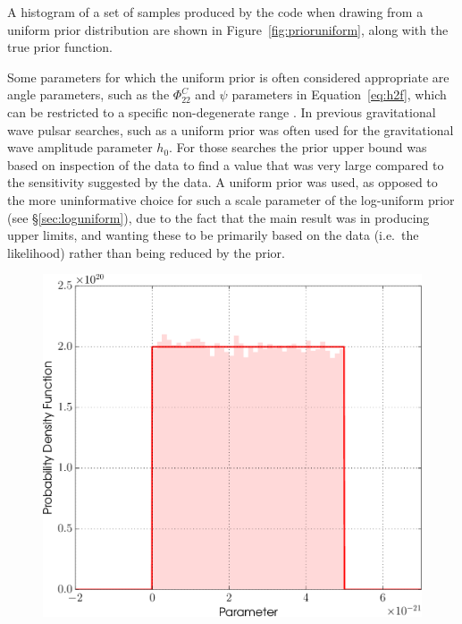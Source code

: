 A histogram of a set of samples produced by the code when drawing from a uniform prior distribution are shown in Figure~\ref{fig:prioruniform},
along with the true prior function.

Some parameters for which the uniform prior is often considered appropriate are angle parameters, such as the $\Phi_{22}^C$ and $\psi$
parameters in Equation~\ref{eq:h2f}, which can be restricted to a specific non-degenerate range \citep[see, e.g., Table~1 in][]{2015MNRAS.453.4399P}. 
In previous gravitational wave pulsar searches, such as \citet{2010ApJ...713..671A,2014ApJ...785..119A} a uniform prior was often used for
the gravitational wave amplitude parameter $h_0$. For those searches the prior upper bound was based on inspection of the data to find a
value that was very large compared to the sensitivity suggested by the data. A uniform prior was used, as opposed to the more
uninformative choice for such a scale parameter of the log-uniform prior (see \S\ref{sec:loguniform}), due to the fact that the main
result was in producing upper limits, and wanting these to be primarily based on the data (i.e.\ the likelihood) rather than being reduced
by the prior.

\begin{figure}[!phtb]
\begin{center}
\includegraphics[width=1\columnwidth]{./figures/priors/uniform/uniform}
\caption{ \protect}
\end{center}
\end{figure}

